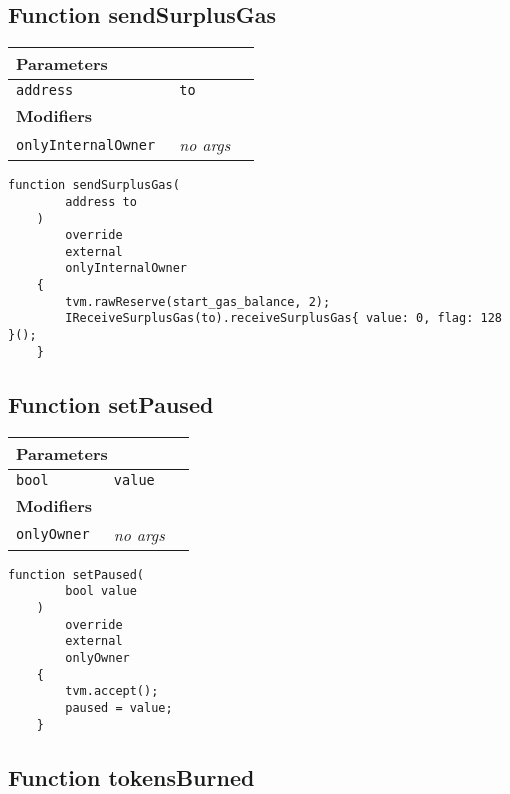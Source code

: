 \subsection{Function sendSurplusGas}


\ifsoltables
\noindent\begin{tabular}{|l|l|p{5cm}|}\hline
\multicolumn{3}{|l|}{\bf Parameters}\\\hline
\tt address & \tt to &\\\hline
\multicolumn{3}{|l|}{\bf Modifiers}\\\hline
\tt onlyInternalOwner & {\em no args} &\\\hline
\end{tabular}
\fi

\vspace{2cm}

\begin{lstlisting}[firstnumber=386]
    function sendSurplusGas(
        address to
    )
        override
        external
        onlyInternalOwner
    {
        tvm.rawReserve(start_gas_balance, 2);
        IReceiveSurplusGas(to).receiveSurplusGas{ value: 0, flag: 128 }();
    }
\end{lstlisting}

\subsection{Function setPaused}


\ifsoltables
\noindent\begin{tabular}{|l|l|p{5cm}|}\hline
\multicolumn{3}{|l|}{\bf Parameters}\\\hline
\tt bool & \tt value &\\\hline
\multicolumn{3}{|l|}{\bf Modifiers}\\\hline
\tt onlyOwner & {\em no args} &\\\hline
\end{tabular}
\fi

\vspace{2cm}

\begin{lstlisting}[firstnumber=407]
    function setPaused(
        bool value
    )
        override
        external
        onlyOwner
    {
        tvm.accept();
        paused = value;
    }
\end{lstlisting}

\subsection{Function tokensBurned}


